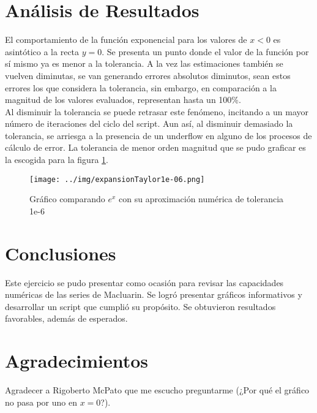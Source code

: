 \documentclass[../portafolio.tex]{subfiles}
\begin{document}
\section{Análisis de Resultados}
El comportamiento de la función exponencial para los valores de $x<0$ es asintótico a la recta $y=0$. Se presenta un punto donde el valor de la función por sí mismo ya es menor a la tolerancia. A la vez las estimaciones también se vuelven diminutas, se van generando errores absolutos diminutos, sean estos errores los que considera la tolerancia, sin embargo, en comparación a la magnitud de los valores evaluados, representan hasta un 100\%. \\
Al disminuir la tolerancia se puede retrasar este fenómeno, incitando a un mayor número de iteraciones del ciclo del script. Aun así, al disminuir demasiado la tolerancia, se arriesga a la presencia de un underflow en alguno de los procesos de cálculo de error. La tolerancia de menor orden magnitud que se pudo graficar es la escogida para la figura \ref{fig:tol0.06}.
\begin{figure}
\centering
\texttt{[image: ../img/expansionTaylor1e-06.png]} 
\caption{Gráfico comparando $e^x$ con su aproximación numérica de tolerancia 1e-6}\label{fig:tol0.06}
\end{figure}


\section*{Conclusiones}
Este ejercicio se pudo presentar como ocasión para revisar las capacidades numéricas de las series de Macluarin. Se logró presentar gráficos informativos y desarrollar un script que cumplió su propósito. Se obtuvieron resultados favorables, además de esperados.
\section*{Agradecimientos}
Agradecer a Rigoberto McPato que me escucho preguntarme (¿Por qué el gráfico no pasa por uno en $x=0$?).
\end{document}
